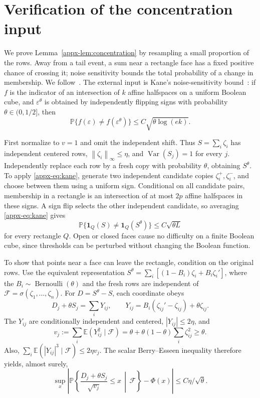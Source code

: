 \documentclass[11pt,letterpaper]{article}
\theoremstyle{remark}
\newcommand{\E}{\mathbb E}
\newcommand{\Pp}{\mathbb P}
\newcommand{\Var}{\operatorname{Var}}
\newcommand{\norm}[1]{\left\lVert#1\right\rVert}
\newcommand{\ind}{\mathbf 1}
\begin{document}
\section{Verification of the concentration input}\label{appx-app:concentration}

We prove Lemma~\ref{appx-lem:concentration} by resampling a small proportion
of the rows. Away from a tail event, a sum near a rectangle face has a
fixed positive chance of crossing it; noise sensitivity bounds the total probability of a
change in membership. We follow~\cite[Lemma 2.1]{AL}. The external
input is Kane's noise-sensitivity bound~\cite[Corollary 1]{Kane}: if \(f\) is the indicator of an intersection
of \(k\) affine halfspaces on a uniform Boolean cube, and
\(\varepsilon^\theta\) is obtained by independently flipping signs
with probability \(\theta\in(0,1/2]\), then
\begin{equation}
 \Pp\{f(\varepsilon)\ne f(\varepsilon^\theta)\}
 \le C\sqrt{\theta\log(ek)}.
 \label{appx-eq:kane}
\end{equation}

First normalize to \(v=1\) and omit the independent shift. Thus
\(S=\sum_i\zeta_i\) has independent centered rows,
\(\norm{\zeta_i}_\infty\le\eta\), and \(\Var(S_j)=1\) for every \(j\).
Independently replace each row by a fresh copy with probability
\(\theta\), obtaining \(S^\theta\).
To apply \eqref{appx-eq:kane}, generate two independent candidate copies
\(\zeta_i^+,\zeta_i^-\), and choose between them using a uniform sign.
Conditional on all candidate pairs, membership in a rectangle is an
intersection of at most \(2p\) affine halfspaces in these signs.
A sign flip selects the other independent candidate, so averaging
\eqref{appx-eq:kane} gives
\begin{equation}
 \Pp\{\ind_Q(S)\ne\ind_Q(S^\theta)\}
 \le C\sqrt{\theta L}
 \label{appx-eq:resampling}
\end{equation}
for every rectangle \(Q\). Open or closed faces cause no difficulty on
a finite Boolean cube, since thresholds can be perturbed without changing
the Boolean function.

To show that points near a face can leave the rectangle, condition on
the original rows. Use the equivalent representation
\(S^\theta=\sum_i[(1-B_i)\zeta_i+B_i\zeta_i']\), where the
\(B_i\sim\operatorname{Bernoulli}(\theta)\) and the fresh rows are
independent of \(\mathcal F=\sigma(\zeta_1,\ldots,\zeta_n)\).
For \(D=S^\theta-S\), each coordinate obeys
\[
 D_j+\theta S_j=\sum_iY_{ij},\qquad
 Y_{ij}=B_i(\zeta_{ij}'-\zeta_{ij})+\theta\zeta_{ij}.
\]
The \(Y_{ij}\) are conditionally independent and centered,
\(|Y_{ij}|\le2\eta\), and
\[
 v_j:=\sum_i\E(Y_{ij}^2\mid\mathcal F)
 =\theta+\theta(1-\theta)\sum_i\zeta_{ij}^2\ge\theta.
\]
Also, \(\sum_i\E(|Y_{ij}|^3\mid\mathcal F)\le2\eta v_j\).
The scalar Berry--Esseen inequality therefore yields, almost surely,
\begin{equation}
 \sup_x\left|
 \Pp\left\{\frac{D_j+\theta S_j}{\sqrt{v_j}}\le x
 \,\middle|\,\mathcal F\right\}-\Phi(x)\right|
 \le C\eta/\sqrt\theta.
 \label{appx-eq:conditional-be}
\end{equation}
\end{document}
